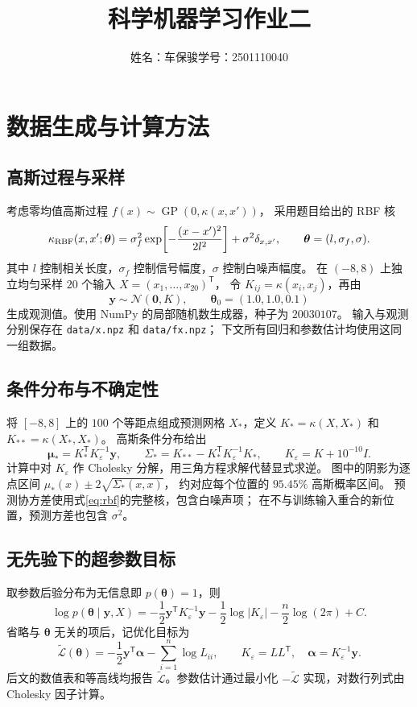 \documentclass[UTF8,a4paper,11pt,fontset=fandol]{ctexart}
\title{科学机器学习作业二}
\author{姓名：车保骏\qquad 学号：2501110040}
\date{}
\newcommand{\tht}{\bm{\theta}}
\newcommand{\score}{\widetilde{\mathcal L}}
\begin{document}
\maketitle

\section{数据生成与计算方法}
\subsection{高斯过程与采样}
考虑零均值高斯过程 $f(x)\sim\operatorname{GP}(0,\kappa(x,x'))$，
采用题目给出的 RBF 核
\begin{equation}\label{eq:rbf}
 \kappa_{\rm RBF}(x,x';\tht)
 =\sigma_f^2\exp\!\left[-\frac{(x-x')^2}{2l^2}\right]
 +\sigma^2\delta_{x,x'},\qquad \tht=(l,\sigma_f,\sigma).
\end{equation}
其中 $l$ 控制相关长度，$\sigma_f$ 控制信号幅度，$\sigma$ 控制白噪声幅度。
在 $(-8,8)$ 上独立均匀采样 $20$ 个输入 $X=(x_1,\ldots,x_{20})^{\mathsf T}$，
令 $K_{ij}=\kappa(x_i,x_j)$，再由
\begin{equation}
 \bm y\sim\mathcal N(\bm 0,K),\qquad \tht_0=(1.0,1.0,0.1)
\end{equation}
生成观测值。使用 NumPy 的局部随机数生成器，种子为 $20030107$。
输入与观测分别保存在 \texttt{data/x.npz} 和 \texttt{data/fx.npz}；
下文所有回归和参数估计均使用这同一组数据。

\subsection{条件分布与不确定性}
将 $[-8,8]$ 上的 $100$ 个等距点组成预测网格 $X_*$，定义
$K_*=\kappa(X,X_*)$ 和 $K_{**}=\kappa(X_*,X_*)$。
高斯条件分布给出
\begin{equation}\label{eq:posterior}
 \bm\mu_*=K_*^{\mathsf T}K_\varepsilon^{-1}\bm y,\qquad
 \Sigma_*=K_{**}-K_*^{\mathsf T}K_\varepsilon^{-1}K_*,\qquad
 K_\varepsilon=K+10^{-10}I.
\end{equation}
计算中对 $K_\varepsilon$ 作 Cholesky 分解，用三角方程求解代替显式求逆。
图中的阴影为逐点区间 $\mu_*(x)\pm2\sqrt{\Sigma_*(x,x)}$，
约对应每个位置的 $95.45\%$ 高斯概率区间。
预测协方差使用式\eqref{eq:rbf}的完整核，包含白噪声项；
在不与训练输入重合的新位置，预测方差也包含 $\sigma^2$。

\subsection{无先验下的超参数目标}
取参数后验分布为无信息即 $p(\tht)=1$，则
\begin{equation}\label{eq:likelihood}
 \log p(\tht\mid\bm y,X)
 =-\frac12\bm y^{\mathsf T}K_\varepsilon^{-1}\bm y
  -\frac12\log|K_\varepsilon|-\frac n2\log(2\pi)+C.
\end{equation}
省略与 $\tht$ 无关的项后，记优化目标为
\begin{equation}\label{eq:score}
 \score(\tht)
 =-\frac12\bm y^{\mathsf T}\bm\alpha-\sum_{i=1}^n\log L_{ii},
 \qquad K_\varepsilon=LL^{\mathsf T},\quad
 \bm\alpha=K_\varepsilon^{-1}\bm y.
\end{equation}
后文的数值表和等高线均报告 $\score$。参数估计通过最小化 $-\score$
实现，对数行列式由 Cholesky 因子计算。
\end{document}

